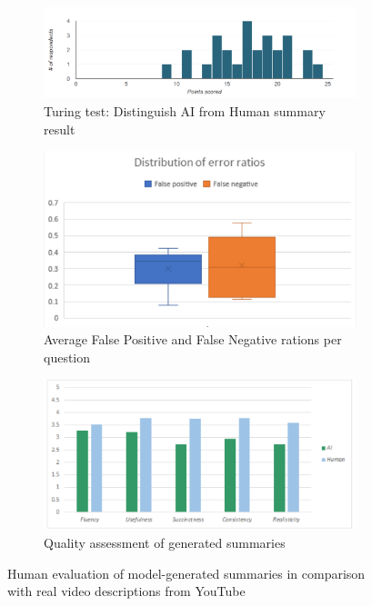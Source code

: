 \documentclass{article}
\begin{document}
\begin{figure}
\begin{subfigure}{.6\textwidth}
  \centering
  \includegraphics[width=\linewidth]{PointsScored.png}
  \caption{Turing test: Distinguish AI from Human summary result }
  \label{fig:scores}
\end{subfigure}%
\begin{subfigure}{.6\textwidth}
  \centering
  \includegraphics[width=\linewidth]{BoxPlots.png}
  \caption{Average False Positive and False Negative rations per question}
  \label{fig:box}
\end{subfigure}
\begin{subfigure}{.6\textwidth}
  \centering
  \includegraphics[width=\linewidth]{scores.png}
  \caption{Quality assessment of generated summaries}
  \label{fig:quality}
\end{subfigure}
\caption{Human evaluation of model-generated summaries in comparison with real video descriptions from YouTube}
\label{fig:survey}
\end{figure}
\end{document}
